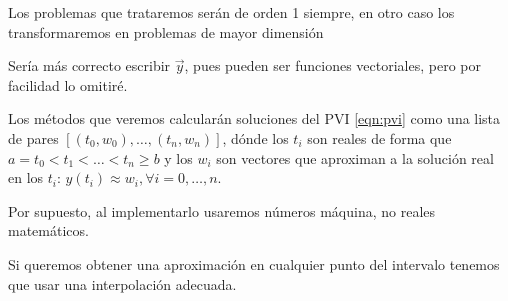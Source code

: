 \begin{remark}Los problemas que trataremos serán de orden 1 siempre, en otro caso los transformaremos en problemas de mayor dimensión \end{remark}
\begin{remark}Sería más correcto escribir $\vec y$, pues pueden ser funciones vectoriales, pero por facilidad lo omitiré. \end{remark}

    Los métodos que veremos calcularán soluciones del PVI \ref{eqn:pvi} como una lista de pares $[(t_0,w_0), \dots, (t_n,w_n)]$, dónde los $t_i$ son reales de forma que $a=t_0<t_1<\dots < t_n\geq b$ y los $w_i$ son vectores que aproximan a la solución real en los $t_i$: $y(t_i)\approx w_i,\forall i=0,\dots, n$.

\begin{remark} Por supuesto, al implementarlo usaremos números máquina, no reales matemáticos.  \end{remark}
\begin{remark} Si queremos obtener una aproximación en cualquier punto del intervalo tenemos que usar una interpolación adecuada. \end{remark}


